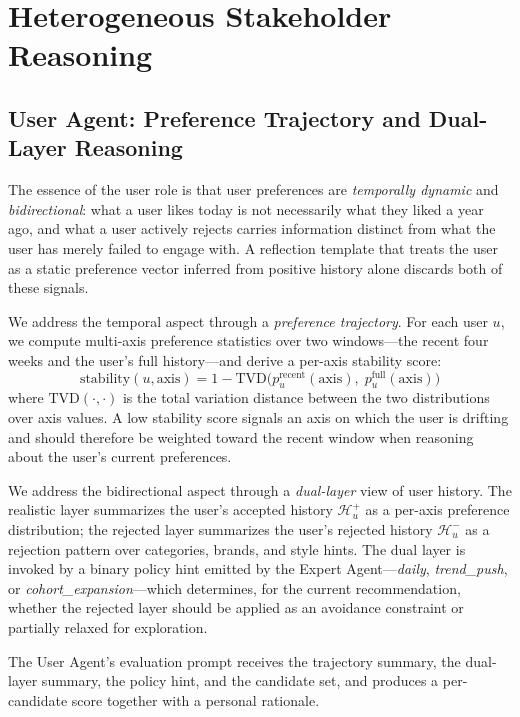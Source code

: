 \documentclass[master,english,final]{postech-ucs}
\begin{document}
\section{Heterogeneous Stakeholder Reasoning}

\subsection{User Agent: Preference Trajectory and Dual-Layer Reasoning}

The essence of the user role is that user preferences are \emph{temporally dynamic} and \emph{bidirectional}: what a user likes today is not necessarily what they liked a year ago, and what a user actively rejects carries information distinct from what the user has merely failed to engage with.
A reflection template that treats the user as a static preference vector inferred from positive history alone discards both of these signals.

We address the temporal aspect through a \emph{preference trajectory}.
For each user $u$, we compute multi-axis preference statistics over two windows---the recent four weeks and the user's full history---and derive a per-axis stability score:
\begin{equation}
    \text{stability}(u, \text{axis}) = 1 - \mathrm{TVD}\bigl( p^{\text{recent}}_u(\text{axis}),\; p^{\text{full}}_u(\text{axis}) \bigr)
\end{equation}
where $\mathrm{TVD}(\cdot,\cdot)$ is the total variation distance between the two distributions over axis values.
A low stability score signals an axis on which the user is drifting and should therefore be weighted toward the recent window when reasoning about the user's current preferences.

We address the bidirectional aspect through a \emph{dual-layer} view of user history.
The realistic layer summarizes the user's accepted history $\mathcal{H}^+_u$ as a per-axis preference distribution; the rejected layer summarizes the user's rejected history $\mathcal{H}^-_u$ as a rejection pattern over categories, brands, and style hints.
The dual layer is invoked by a binary policy hint emitted by the Expert Agent---\emph{daily}, \emph{trend\_push}, or \emph{cohort\_expansion}---which determines, for the current recommendation, whether the rejected layer should be applied as an avoidance constraint or partially relaxed for exploration.

The User Agent's evaluation prompt receives the trajectory summary, the dual-layer summary, the policy hint, and the candidate set, and produces a per-candidate score together with a personal rationale.
\end{document}
